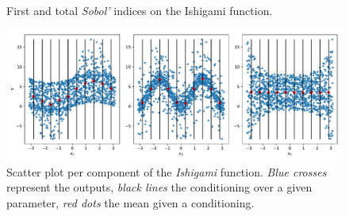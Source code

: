 \begin{figure}[!ht]               
\centering
{}
~
\caption{First and total \textit{Sobol'} indices on the Ishigami function.}
\label{fig:sobol}
\end{figure}


\begin{figure}[!ht]
\centering
\includegraphics[width=\linewidth,keepaspectratio]{fig/literature/scatter_sobol.pdf}
\caption{Scatter plot per component of the \textit{Ishigami} function. \emph{Blue crosses} represent the outputs, \emph{black lines} the conditioning over a given parameter, \emph{red dots} the mean given a conditioning.}
\label{fig:scatter_sobol}
\end{figure}

